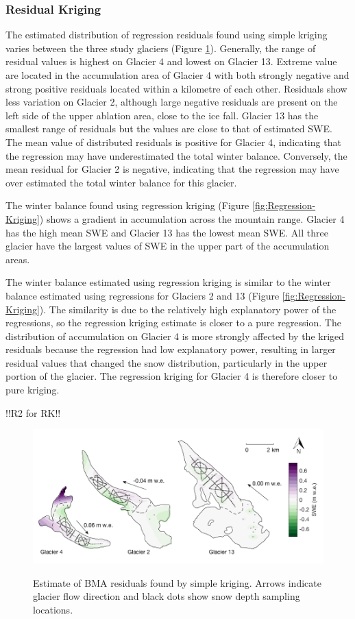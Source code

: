 \documentclass[12pt]{article}
\newcommand{\topomap}{Arrows indicate glacier flow direction and black dots show snow depth sampling locations. }
\begin{document}
\subsubsection{Residual Kriging}

The estimated distribution of regression residuals found using simple kriging varies between the three study glaciers (Figure \ref{fig:residualsKRIGING}). Generally, the range of residual values is highest on Glacier 4 and lowest on Glacier 13. Extreme value are located in the accumulation area of Glacier 4 with both strongly negative and strong positive residuals located within a kilometre of each other. Residuals show less variation on Glacier 2, although large negative residuals are present on the left side of the upper ablation area, close to the ice fall. Glacier 13 has the smallest range of residuals but the values are close to that of estimated SWE. The mean value of distributed residuals is positive for Glacier 4, indicating that the regression may have underestimated the total winter balance. Conversely, the mean residual for Glacier 2 is negative, indicating that the regression may have over estimated the total winter balance for this glacier. 

The winter balance found using regression kriging (Figure \ref{fig:Regression-Kriging}) shows a gradient in accumulation across the mountain range. Glacier 4 has the high mean SWE and Glacier 13 has the lowest mean SWE. All three glacier have the largest values of SWE in the upper part of the accumulation areas. 

The winter balance estimated using regression kriging is similar to the winter balance estimated using regressions for Glaciers 2 and 13 (Figure \ref{fig:Regression-Kriging}). The similarity is due to the relatively high explanatory power of the regressions, so the regression kriging estimate is closer to a pure regression. The distribution of accumulation on Glacier 4 is more strongly affected by the kriged residuals because the regression had low explanatory power, resulting in larger residual values that changed the snow distribution, particularly in the upper portion of the glacier. The regression kriging for Glacier 4 is therefore closer to pure kriging.

!!R2 for RK!!

\begin{figure}
	\centering
	\includegraphics[width = \textwidth]{residualsKriged.png}\\
	\caption{Estimate of BMA residuals found by simple kriging. \topomap}
	\label{fig:residualsKRIGING}
\end{figure}
\end{document}
